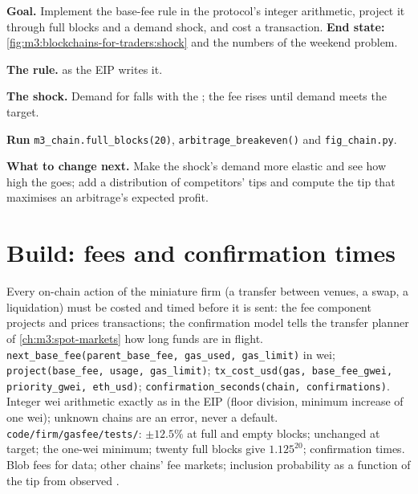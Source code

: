 \begin{tutorial}
\textbf{Goal.} Implement the base-fee rule in the protocol's integer arithmetic, project it through full
blocks and a demand shock, and cost a transaction. \textbf{End state:}
\cref{fig:m3:blockchains-for-traders:shock} and the numbers of the weekend problem.
\begin{tutsteps}
\item \textbf{The rule.}  as the EIP writes it.
\label{lst:m3:blockchains-for-traders:basefee}
\item \textbf{The shock.} Demand for  falls with the ; the fee rises until demand meets the target.
\label{lst:m3:blockchains-for-traders:shock}
\item \textbf{Run} \texttt{m3\_chain.full\_blocks(20)}, \texttt{arbitrage\_breakeven()} and \texttt{fig\_chain.py}.
\end{tutsteps}
\textbf{What to change next.} Make the shock's demand more elastic and see how high the  goes; add a
distribution of competitors' tips and compute the tip that maximises an arbitrage's expected profit.
\end{tutorial}

\section{Build: fees and confirmation times}\label{bld:m3:blockchains-for-traders:gasfee}

\begin{build}
 Every on-chain action of the miniature firm (a transfer between venues, a swap, a liquidation)
must be costed and timed before it is sent: the fee component projects  and prices transactions; the
confirmation model tells the transfer planner of \cref{ch:m3:spot-markets} how long funds are in flight.
 \texttt{next\_base\_fee(parent\_base\_fee, gas\_used, gas\_limit)} in wei;
\texttt{project(base\_fee, usage, gas\_limit)}; \texttt{tx\_cost\_usd(gas, base\_fee\_gwei, priority\_gwei,
eth\_usd)}; \texttt{confirmation\_seconds(chain, confirmations)}.
 Integer wei arithmetic exactly as in the EIP (floor division, minimum increase of one wei);
unknown chains are an error, never a default.
 \texttt{code/firm/gasfee/tests/}: $\pm12.5\%$ at full and empty blocks; unchanged at
target; the one-wei minimum; twenty full blocks give $1.125^{20}$; confirmation times.
 Blob fees for  data; other chains' fee markets; inclusion probability as a function of the
tip from observed .
\end{build}

